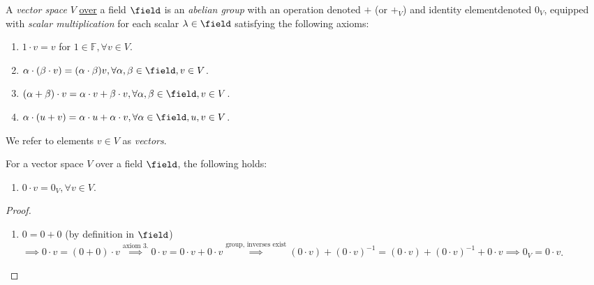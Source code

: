 
\begin{definition}
    A \emph{vector space} $V$ \underline{over} a field $\field$ is an \emph{abelian group} with an operation denoted $+$ (or $+_V$) and identity element\footnotemark denoted $0_V$, equipped with \emph{scalar multiplication} for each scalar $\lambda \in \field$ satisfying the following axioms:
    \begin{enumerate}
        \item $1 \cdot v = v$ for $1 \in \mathbb{F}, \forall v \in V$.
        \item $\alpha\cdot(\beta \cdot v) = (\alpha \cdot \beta)v, \forall \alpha, \beta \in \field, v \in V$.
        \item $(\alpha + \beta) \cdot v = \alpha \cdot v + \beta \cdot v, \forall \alpha, \beta \in \field, v \in V$.
        \item $\alpha \cdot (u + v) = \alpha \cdot u + \alpha \cdot v, \forall \alpha \in \field, u, v \in V$.
    \end{enumerate}
    We refer to elements $v \in V$ as \emph{vectors}.
\end{definition}

\begin{proposition}
    For a vector space $V$ over a field $\field$, the following holds:
    \begin{enumerate}
        \item $0 \cdot v = 0_V, \forall v \in V$.
    \end{enumerate}
\end{proposition}

\begin{proof}
    \begin{enumerate}
        \item $0 = 0 + 0$ (by definition in $\field$) $\implies 0\cdot v = (0 + 0) \cdot v \overset{\text{axiom 3.}}{\implies} 0 \cdot v = 0 \cdot v + 0 \cdot v \overset{\text{group, inverses exist}}\implies (0 \cdot v) + (0 \cdot v)^{-1} = (0 \cdot v) + (0 \cdot v)^{-1} + 0 \cdot v \implies 0_V = 0 \cdot v$.
    \end{enumerate}
\end{proof}